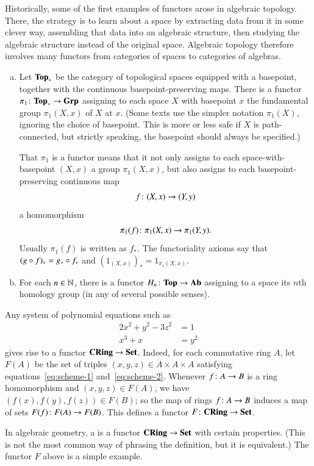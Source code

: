 \begin{examples}
\label{egs:functors:homo-homo}
%
%
Historically, some of the first examples of functors arose in algebraic
topology.  There, the strategy is to learn about a space by extracting data
from it in some clever way, assembling that data into an algebraic
structure, then studying the algebraic structure instead of the original
space.  Algebraic topology therefore involves many functors from categories
of spaces to categories of algebras.
%
\begin{enumerate}[(b)]
\item
Let $\mathbf{Top}_*$%
%
%
 be the category of topological spaces equipped with a
basepoint, together with the continuous basepoint-preserving maps.  There
is a functor $\pi_1\from \Tp_* \to \Grp$%
%
%
assigning to each space $X$ with basepoint $x$ the fundamental%
%
%
group $\pi_1(X, x)$ of $X$ at $x$.  (Some texts use the simpler notation
$\pi_1(X)$, ignoring the choice of basepoint.  This is more or less safe if
$X$ is path-connected, but strictly speaking, the basepoint should always
be specified.)

That $\pi_1$ is a functor means that it not only assigns to each
space-with-basepoint $(X, x)$ a group $\pi_1(X, x)$, but also assigns to
each basepoint-pre\-ser\-ving continuous map
\[
f\from (X, x) \to (Y, y)
\]
a homomorphism
\[
\pi_1(f)\from \pi_1(X, x) \to \pi_1(Y, y).
\]
Usually $\pi_1(f)$ is written as $f_*$.  The functoriality axioms say that $(g
\mathbin{\circ} f)_* = g_* \mathbin{\circ} f_*$ and $(1_{(X, x)})_* = 1_{\pi_1(X, x)}$.

\item
For each $n \in \mathbb{N}$, there is a functor $H_n\from \Tp \to \Ab$%
%
%
assigning to a space its $n$th homology%
%
%
group (in any of several possible senses).
\end{enumerate}
\end{examples}

\begin{example}
Any system of polynomial%
%
%
%
equations such as
%
\begin{align}
2x^2 + y^2 - 3z^2       &
=
1
\label{eq:scheme-1}     \\
x^3 + x     &
=
y^2
\label{eq:scheme-2}
\end{align}
%
gives rise to a functor $\mathbf{CRing} \to \mathbf{Set}$.  Indeed, for each commutative
ring $A$, let $F(A)$ be the set of triples $(x, y, z) \in A \times A \times
A$ satisfying equations~\eqref{eq:scheme-1} and~\eqref{eq:scheme-2}.
Whenever $f\from A \to B$ is a ring homomorphism and $(x, y, z) \in F(A)$,
we have $(f(x), f(y), f(z)) \in F(B)$; so the map of rings $f\from A \to B$
induces a map of sets $F(f) \from F(A) \to F(B)$.  This defines a functor
$F\from \CRing \to \Set$.

In algebraic%
%
%
geometry, a %
%
%
is a functor $\mathbf{CRing} \to \mathbf{Set}$ with certain properties.  (This is not the
most common way of phrasing the definition, but it is equivalent.)  The
functor $F$ above is a simple example.
\end{example}

